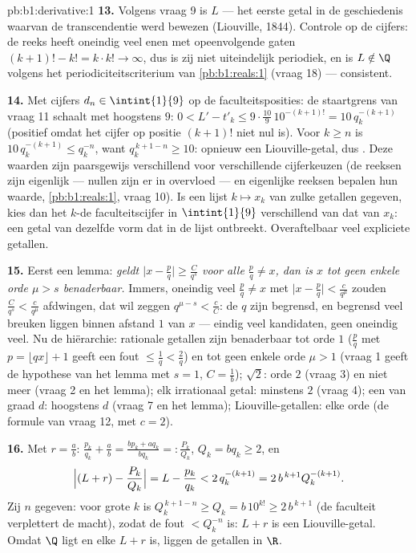 \begin{solution}{pb:b1:derivative:1}
\textbf{13.} Volgens vraag 9 is $L$  --- het eerste
getal in de geschiedenis waarvan de transcendentie werd bewezen
(Liouville, 1844). Controle op de cijfers: de reeks heeft
oneindig veel enen met opeenvolgende gaten $(k+1)! - k! = k\cdot
k! \to \infty$, dus is zij niet uiteindelijk periodiek, en is $L
\notin \Q$ volgens het periodiciteitscriterium van
\cref{pb:b1:reals:1} (vraag 18) --- consistent.

\textbf{14.} Met cijfers $d_n \in \intint{1}{9}$ op de
faculteitsposities: de staartgrens van vraag 11 schaalt met
hoogstens $9$: $0 < L' - t'_k \leq
9\cdot\frac{10}{9}\,10^{-(k+1)!} = 10\,q_k^{-(k+1)}$ (positief
omdat het cijfer op positie $(k+1)!$ niet nul is). Voor $k \geq
n$ is $10\,q_k^{-(k+1)} \leq q_k^{-n}$, want $q_k^{\,k+1-n} \geq
10$: opnieuw een Liouville-getal, dus . Deze waarden
zijn paarsgewijs verschillend voor verschillende cijferkeuzen (de
reeksen zijn eigenlijk --- nullen zijn er in overvloed --- en
eigenlijke reeksen bepalen hun waarde, \cref{pb:b1:reals:1},
vraag 10). Is een lijst $k \mapsto x_k$ van zulke getallen
gegeven, kies dan het $k$-de faculteitscijfer in $\intint{1}{9}$
verschillend van dat van $x_k$: een getal van dezelfde vorm dat
in de lijst ontbreekt. Overaftelbaar veel expliciete
 getallen.

\textbf{15.} Eerst een lemma: \emph{geldt $\bigl|x - \frac
pq\bigr| \geq \frac{C}{q^s}$ voor alle $\frac pq \neq x$, dan is
$x$ tot geen enkele orde $\mu > s$ benaderbaar.} Immers,
oneindig veel $\frac pq \neq x$ met $\bigl|x - \frac pq\bigr| <
\frac{c}{q^\mu}$ zouden $\frac{C}{q^s} < \frac{c}{q^\mu}$
afdwingen, dat wil zeggen $q^{\mu - s} < \frac cC$: de $q$ zijn
begrensd, en begrensd veel breuken liggen binnen afstand $1$ van
$x$ --- eindig veel kandidaten, geen oneindig veel. Nu de
hiërarchie: rationale getallen zijn benaderbaar tot orde $1$
($\frac pq$ met $p = \lfloor qx\rfloor + 1$ geeft een fout $\leq
\frac1q < \frac2q$) en tot geen enkele orde $\mu > 1$ (vraag 1
geeft de hypothese van het lemma met $s = 1$, $C = \frac1b$);
$\sqrt2$: orde $2$ (vraag 3) en niet meer (vraag 2 en het lemma);
elk irrationaal getal: minstens $2$ (vraag 4); een  van graad $d$: hoogstens $d$ (vraag 7 en het lemma);
Liouville-getallen: elke orde (de formule van vraag 12, met $c =
2$).

\textbf{16.} Met $r = \frac ab$: $\frac{p_k}{q_k} + \frac ab =
\frac{b p_k + a q_k}{b q_k} =: \frac{P_k}{Q_k}$, $Q_k = b q_k
\geq 2$, en
\[
\Bigl|(L + r) - \frac{P_k}{Q_k}\Bigr| = L - \frac{p_k}{q_k}
< 2\,q_k^{-(k+1)} = 2\,b^{\,k+1} Q_k^{-(k+1)} .
\]
Zij $n$ gegeven: voor grote $k$ is $Q_k^{\,k+1-n} \geq Q_k =
b\,10^{k!} \geq 2\,b^{\,k+1}$ (de faculteit verplettert de
macht), zodat de fout $< Q_k^{-n}$ is: $L + r$ is een
Liouville-getal. Omdat $\Q$  ligt en elke $L + r$
 is, liggen de  getallen  in $\R$.


\end{solution}
